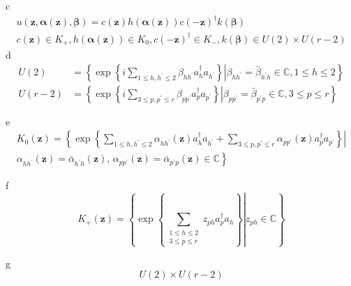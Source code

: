 \documentclass[aps,preprint]{revtex4}%
\begin{document}
c%
\begin{gather*}
u\left(  \mathbf{z,\alpha\left(  \mathbf{z}\right)  ,\beta}\right)  =c\left(
\mathbf{z}\right)  h\left(  \mathbf{\alpha}\left(  \mathbf{z}\right)  \right)
c\left(  -\mathbf{z}\right)  ^{\dagger}k\left(  \mathbf{\beta}\right) \\
c\left(  \mathbf{z}\right)  \in K_{+},h\left(  \mathbf{\alpha}\left(
\mathbf{z}\right)  \right)  \in K_{0},c\left(  -\mathbf{z}\right)  ^{\dagger
}\in K_{-},k\left(  \mathbf{\beta}\right)  \in U\left(  2\right)  \times
U\left(  r-2\right)
\end{gather*}
d%
\begin{align}
U\left(  2\right)   &  =\left\{  \left.  \exp\left\{  i\sum\limits_{1\leq
h,h^{\prime}\leq2}\beta_{hh^{\prime}}a_{h}^{\dagger}a_{h^{\prime}}\right\}
\right\vert \beta_{hh^{\prime}}=\bar{\beta}_{h^{\prime}h}\in\mathbb{C},1\leq
h\leq2\right\} \nonumber\\
U\left(  r-2\right)   &  =\left\{  \left.  \exp\left\{  i\sum\limits_{3\leq
p,p^{\prime}\leq r}\beta_{pp^{\prime}}a_{p}^{\dagger}a_{p^{\prime}}\right\}
\right\vert \beta_{pp^{\prime}}=\bar{\beta}_{p^{\prime}p}\in\mathbb{C},3\leq
p\leq r\right\} \nonumber
\end{align}


e%
\begin{gather*}
K_{0}\left(  \mathbf{z}\right)  =\left\{  \left.  \exp\left\{  \sum
\limits_{1\leq h,h^{\prime}\leq2}\alpha_{hh^{\prime}}\left(  \mathbf{z}%
\right)  a_{h}^{\dagger}a_{h^{\prime}}+\sum\limits_{3\leq p,p^{\prime}\leq
r}\alpha_{pp^{\prime}}\left(  \mathbf{z}\right)  a_{p}^{\dagger}a_{p^{\prime}%
}\right\}  \right\vert \right. \\
\left.  \alpha_{hh^{\prime}}\left(  \mathbf{z}\right)  =\bar{\alpha
}_{h^{\prime}h}\left(  \mathbf{z}\right)  ,\,\alpha_{pp^{\prime}}\left(
\mathbf{z}\right)  =\bar{\alpha}_{p^{\prime}p}\left(  \mathbf{z}\right)
\in\mathbb{C}\right\}
\end{gather*}


f%
\[
K_{+}\left(  \mathbf{z}\right)  =\left\{  \left.  \exp\left\{  \sum
\limits_{\substack{1\leq h\leq2\\3\leq p\leq r}}z_{ph}a_{p}^{\dagger}%
a_{h}\right\}  \right\vert z_{ph}\in\mathbb{C}\right\}
\]


g%
\[
U\left(  2\right)  \times U\left(  r-2\right)
\]
\end{document}
